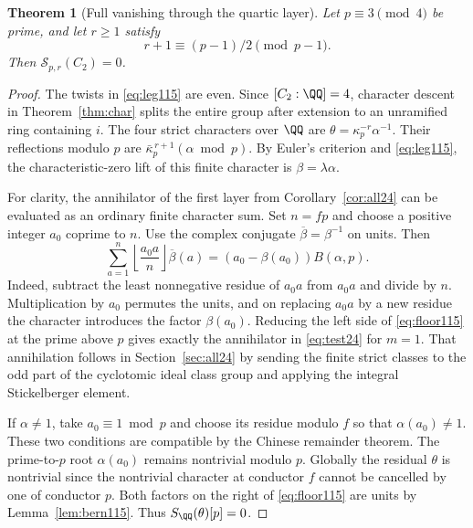 \documentclass[a4paper,11pt]{article}
\newtheorem{theorem}[proposition]{Theorem}
\theoremstyle{definition}
\theoremstyle{remark}
\numberwithin{equation}{section}
\begin{document}
\begin{theorem}[Full vanishing through the quartic layer]
\label{thm:quartic115}
Let \(p\equiv3\pmod4\) be prime, and let \(r\ge1\) satisfy
\begin{equation}
       r+1\equiv (p-1)/2\pmod{p-1}.                      \label{eq:leg115}
\end{equation}
Then \(\mathcal S_{p,r}(C_2)=0\).
\end{theorem}
\begin{proof}
The twists in \eqref{eq:leg115} are even. Since
\([C_2:\QQ]=4\), character descent in Theorem~\ref{thm:char}
splits the entire group after extension to an unramified ring
containing \(i\). The four strict characters over \(\QQ\)
are \(\theta=\kappa_p^{-r}\alpha^{-1}\). Their reflections
modulo \(p\) are \(\bar\kappa_p^{\,r+1}(\alpha\bmod p)\).
By Euler's
criterion and \eqref{eq:leg115}, the characteristic-zero lift
of this finite character is \(\beta=\lambda\alpha\).

For clarity, the annihilator of the first layer from
Corollary~\ref{cor:all24} can be evaluated as an ordinary
finite character sum. Set \(n=fp\) and choose a positive
integer \(a_0\) coprime to \(n\). Use the complex conjugate
\(\overline\beta=\beta^{-1}\) on units. Then
\begin{equation}
 \sum_{a=1}^{n}\left\lfloor\frac{a_0a}{n}\right\rfloor
                \overline\beta(a)
       =(a_0-\beta(a_0))B(\alpha,p).                       \label{eq:floor115}
\end{equation}
Indeed, subtract the least nonnegative residue of \(a_0a\)
from \(a_0a\) and divide by \(n\). Multiplication by \(a_0\)
permutes the units, and on replacing \(a_0a\) by a new residue
the character introduces the factor \(\beta(a_0)\). Reducing
the left side of \eqref{eq:floor115} at the prime above \(p\)
gives exactly the annihilator in \eqref{eq:test24} for \(m=1\).
That annihilation follows in Section~\ref{sec:all24} by sending
the finite strict classes to the odd part of the cyclotomic
ideal class group and applying the integral Stickelberger element.

If \(\alpha\ne1\), take \(a_0\equiv1\bmod p\) and choose its
residue modulo \(f\) so that \(\alpha(a_0)\ne1\). These two
conditions are compatible by the Chinese remainder theorem.
The prime-to-\(p\) root \(\alpha(a_0)\) remains nontrivial
modulo \(p\). Globally the residual \(\theta\) is nontrivial
since the nontrivial character at conductor \(f\) cannot be
cancelled by one of conductor \(p\). Both factors on the right
of \eqref{eq:floor115} are units by Lemma~\ref{lem:bern115}.
Thus \(S_\QQ(\theta)[p]=0\).


\end{proof}
\end{document}
